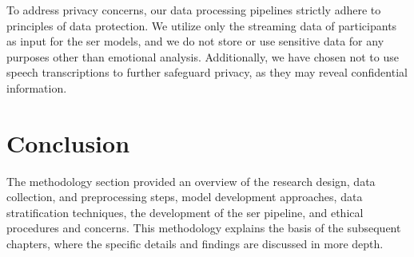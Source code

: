 To address privacy concerns, our data processing pipelines strictly adhere to principles of data protection. We utilize only the streaming data of participants as input for the \ac{ser} models, and we do not store or use sensitive data for any purposes other than emotional analysis. Additionally, we have chosen not to use speech transcriptions to further safeguard privacy, as they may reveal confidential information.

\section{Conclusion}

The methodology section provided an overview of the research design, data collection, and preprocessing steps, model development approaches, data stratification techniques, the development of the \ac{ser} pipeline, and ethical procedures and concerns. This methodology explains the basis of the subsequent chapters, where the specific details and findings are discussed in more depth.



